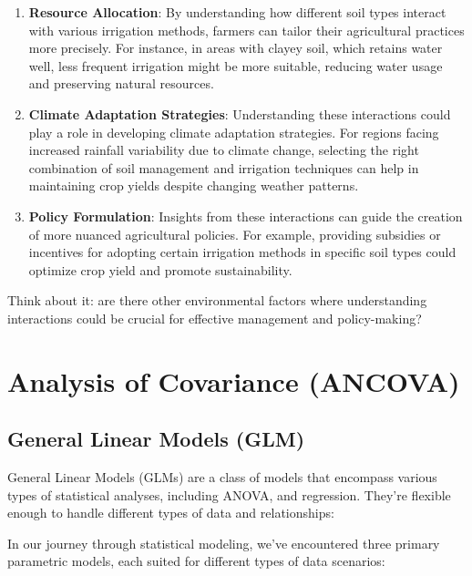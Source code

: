 \documentclass[
  letterpaper,
  DIV=11,
  numbers=noendperiod]{scrreprt}
\begin{document}
\begin{enumerate}
\def\labelenumi{\arabic{enumi}.}
\item
  \textbf{Resource Allocation}: By understanding how different soil
  types interact with various irrigation methods, farmers can tailor
  their agricultural practices more precisely. For instance, in areas
  with clayey soil, which retains water well, less frequent irrigation
  might be more suitable, reducing water usage and preserving natural
  resources.
\item
  \textbf{Climate Adaptation Strategies}: Understanding these
  interactions could play a role in developing climate adaptation
  strategies. For regions facing increased rainfall variability due to
  climate change, selecting the right combination of soil management and
  irrigation techniques can help in maintaining crop yields despite
  changing weather patterns.
\item
  \textbf{Policy Formulation}: Insights from these interactions can
  guide the creation of more nuanced agricultural policies. For example,
  providing subsidies or incentives for adopting certain irrigation
  methods in specific soil types could optimize crop yield and promote
  sustainability.
\end{enumerate}

Think about it: are there other environmental factors where
understanding interactions could be crucial for effective management and
policy-making?


\chapter{Analysis of Covariance
(ANCOVA)}\label{analysis-of-covariance-ancova}

\section{General Linear Models (GLM)}\label{general-linear-models-glm}

General Linear Models (GLMs) are a class of models that encompass
various types of statistical analyses, including ANOVA, and regression.
They're flexible enough to handle different types of data and
relationships:

In our journey through statistical modeling, we've encountered three
primary parametric models, each suited for different types of data
scenarios:
\end{document}
